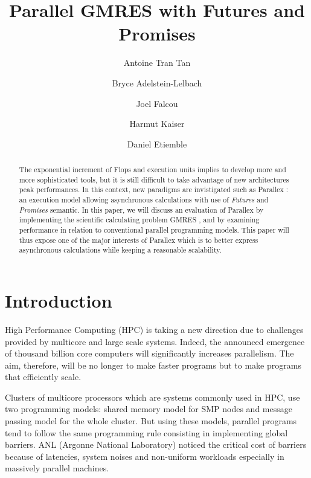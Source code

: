\documentclass{llncs}
\begin{document}
\title{Parallel GMRES with Futures and Promises}

\author{Antoine Tran Tan \and Bryce Adelstein-Lelbach \and Joel Falcou \and Harmut Kaiser \and
Daniel Etiemble }

\maketitle

\begin{abstract}
The exponential increment of Flops and execution units implies to develop more and more sophisticated tools, but it is still difficult to take advantage of new architectures peak performances. In this context, new paradigms are invistigated such as Parallex \cite{Parallex}: an execution model allowing asynchronous calculations with use of \emph{Futures} and \emph{Promises} semantic. In this paper, we will discuss an evaluation of Parallex by implementing the scientific calculating problem GMRES \cite{GMRES}, and by examining performance in relation to conventional parallel programming models. This paper will thus expose one of the major interests of Parallex which is to better express asynchronous calculations while keeping a reasonable scalability. 
\end{abstract}


\section{Introduction}\label{Introduction}
High Performance Computing (HPC) is taking a new direction due to challenges provided by multicore and large scale systems. Indeed, the announced emergence of thousand billion core computers will significantly increases parallelism. The aim, therefore, will be no longer to make faster programs but to make programs that efficiently scale.\smallskip 

Clusters of multicore processors which are systems commonly used in HPC, use two programming models: shared memory model for SMP nodes and message passing model for the whole cluster. But using these models, parallel programs tend to follow the same programming rule consisting in implementing global barriers. ANL (Argonne National Laboratory) noticed the critical cost of barriers because of latencies, system noises and non-uniform workloads especially in massively parallel machines.\smallskip 
\end{document}

